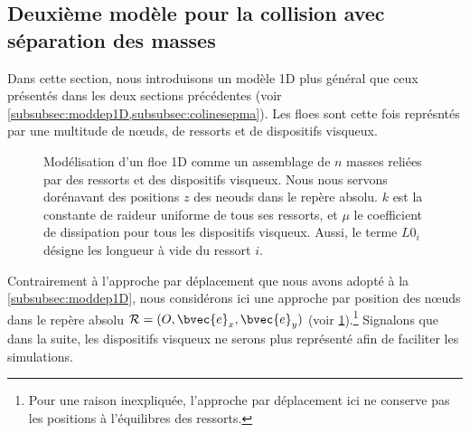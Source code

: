




\subsection{Deuxième modèle pour la collision avec séparation des masses}
\label{subsec:model1d2}



Dans cette section, nous introduisons un modèle 1D plus général que ceux présentés dans les deux sections précédentes (voir \cref{subsubsec:moddep1D,subsubsec:colinesepma}). Les floes sont cette fois représntés par une multitude de n\oe{}uds, de ressorts et de dispositifs visqueux. 
\begin{figure}[!h]
    \centering
    \caption{Modélisation d'un floe 1D comme un assemblage de $n$ masses reliées par des ressorts et des dispositifs visqueux. Nous nous servons dorénavant des positions $z$ des neouds dans le repère absolu. $k$ est la constante de raideur uniforme de tous ses ressorts, et $\mu$ le coefficient de dissipation pour tous les dispositifs visqueux. Aussi, le terme $L0_i$ désigne les longueur à vide du ressort $i$.}
    \label{fig:dep1d4}
\end{figure}
Contrairement à l'approche par déplacement que nous avons adopté à la \cref{subsubsec:moddep1D}, nous considérons ici une approche par position des n\oe{}uds dans le repère absolu $\mathcal{R}= (O, \bvec{e}_x, \bvec{e}_y)$ (voir \cref{fig:dep1d4}).\footnote{Pour une raison inexpliquée, l'approche par déplacement ici ne conserve pas les positions à l'équilibres des ressorts.} Signalons que dans la suite, les dispositifs visqueux ne serons plus représenté afin de faciliter les simulations.  


